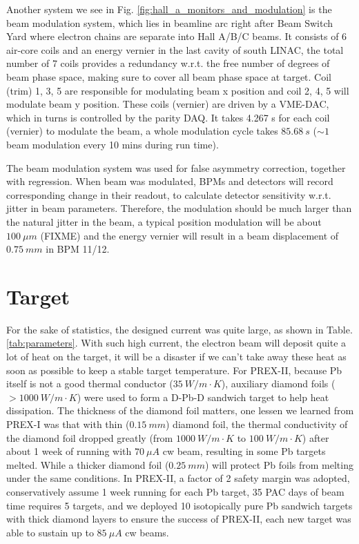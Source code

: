 Another system we see in Fig. \ref{fig:hall_a_monitors_and_modulation} is the
beam modulation system, which lies in beamline arc right after Beam Switch Yard 
where electron chains are separate into Hall A/B/C beams.
It consists of 6 air-core coils and an energy vernier in the last cavity of south LINAC, 
the total number of 7 coils provides a redundancy w.r.t. the free number of degrees 
of beam phase space, making sure to cover all beam phase space at target.  
Coil (trim) 1, 3, 5 are responsible for modulating beam x position and coil 
2, 4, 5 will modulate beam y position.
These coils (vernier) are driven by a VME-DAC, which in turns is controlled by the parity DAQ.
It takes 4.267 s for each coil (vernier) to modulate the beam, a whole 
modulation cycle takes $85.68 \ s$ ($\sim 1$ beam modulation every 10 mins during
run time). 

The beam modulation system was used for false asymmetry correction, together with
regression. When beam was modulated, BPMs and detectors will record corresponding
change in their readout, to calculate detector sensitivity w.r.t. jitter in beam
parameters. Therefore, the modulation should be much larger than the natural
jitter in the beam, a typical position modulation will be about $100\ \mu m$ (FIXME)
and the energy vernier will result in a beam displacement of $0.75 \ mm$ in BPM 11/12.

\section{Target}
For the sake of statistics, the designed current was quite large, as shown in
Table. \ref{tab:parameters}. With such high current, the electron beam will deposit quite
a lot of heat on the target, it will be a disaster if we can't take away these
heat as soon as possible to keep a stable target temperature.
For PREX-II, because Pb itself is not a good thermal conductor ($35\ W/m\cdot K$),
auxiliary diamond foils ($> 1000\ W/m\cdot K$) were used to form a D-Pb-D sandwich target to help heat
dissipation. The thickness of the diamond foil matters, one lessen we learned 
from PREX-I was that with thin ($0.15\ mm$) diamond foil, the thermal conductivity
of the diamond foil dropped greatly (from $1000 \ W/m \cdot K$ to $100 \ W/m\cdot K$) after about 
1 week of running with $70\ \mu A$ cw beam, resulting in some Pb targets melted. 
While a thicker diamond foil ($0.25\ mm$) will protect Pb foils from melting 
under the same conditions. In PREX-II, a factor of 2 safety margin was
adopted, conservatively assume 1 week running for each Pb target, 35 PAC days of beam time
requires 5 targets, and we deployed 10 isotopically pure Pb sandwich targets with 
thick diamond layers to ensure the success of PREX-II, each new target was able
to sustain up to $85\ \mu A$ cw beams.

